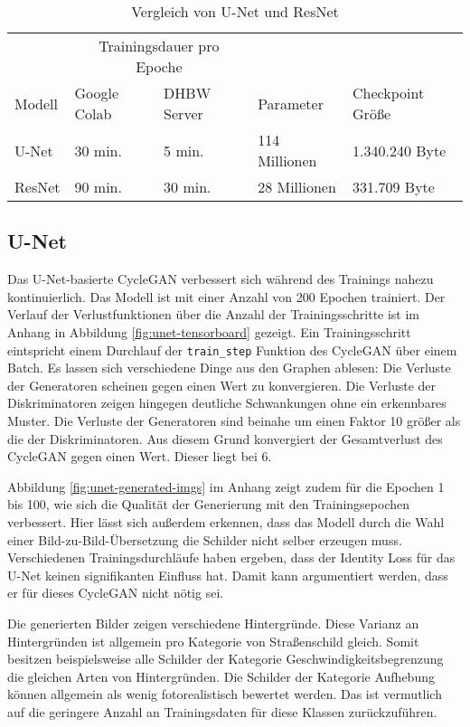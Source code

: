 \begin{table}[H]
   \centering
   \begin{tabular}{lllll}
   \toprule
   & \multicolumn{2}{c}{Trainingsdauer pro Epoche} & \\
   
   \cmidrule(r){2-3}
   
   Modell & Google Colab & DHBW Server & Parameter & Checkpoint Größe \\
   \midrule
   U-Net & 30 min. & 5 min. & 114 Millionen & 1.340.240 Byte \\
   ResNet & 90 min. & 30 min. & 28 Millionen & 331.709 Byte \\
   \bottomrule
    \end{tabular}
    \caption{Vergleich von U-Net und ResNet}
\end{table}

\subsection{U-Net}
Das U-Net-basierte \ac{CycleGAN} verbessert sich während des Trainings nahezu kontinuierlich. Das Modell ist mit einer Anzahl von 200 Epochen trainiert. Der Verlauf der Verlustfunktionen über die Anzahl der Trainingsschritte ist im Anhang in Abbildung \ref{fig:unet-tensorboard} gezeigt. Ein Trainingsschritt eintspricht einem Durchlauf der \texttt{train_step} Funktion des \ac{CycleGAN} über einem Batch.  Es lassen sich verschiedene Dinge aus den Graphen ablesen: Die Verluste der Generatoren scheinen gegen einen Wert zu konvergieren. Die Verluste der Diskriminatoren zeigen hingegen deutliche Schwankungen ohne ein erkennbares Muster. Die Verluste der Generatoren sind beinahe um einen Faktor 10 größer als die der Diskriminatoren. Aus diesem Grund konvergiert der Gesamtverlust des \ac{CycleGAN} gegen einen Wert. Dieser liegt bei 6.

Abbildung \ref{fig:unet-generated-imgs} im Anhang zeigt zudem für die Epochen 1 bis 100, wie sich die Qualität der Generierung mit den Trainingsepochen verbessert. Hier lässt sich außerdem erkennen, dass das Modell durch die Wahl einer Bild-zu-Bild-Übersetzung die Schilder nicht selber erzeugen muss. Verschiedenen Trainingsdurchläufe haben ergeben, dass der Identity Loss für das U-Net keinen signifikanten Einfluss hat. Damit kann argumentiert werden, dass er für dieses \ac{CycleGAN} nicht nötig sei.

Die generierten Bilder zeigen verschiedene Hintergründe. Diese Varianz an Hintergründen ist allgemein pro Kategorie von Straßenschild gleich. Somit besitzen beispielsweise alle Schilder der Kategorie Geschwindigkeitsbegrenzung die gleichen Arten von Hintergründen. Die Schilder der Kategorie Aufhebung können allgemein als wenig fotorealistisch bewertet werden. Das ist vermutlich auf die geringere Anzahl an Trainingsdaten für diese Klassen zurückzuführen.

